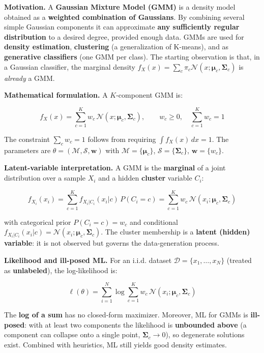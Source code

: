 \textbf{Motivation.} A \textbf{Gaussian Mixture Model (GMM)} is a density model obtained as a \textbf{weighted combination of Gaussians}. By combining several simple Gaussian components it can approximate \textbf{any sufficiently regular distribution} to a desired degree, provided enough data. GMMs are used for \textbf{density estimation}, \textbf{clustering} (a generalization of K-means), and as \textbf{generative classifiers} (one GMM per class). The starting observation is that, in a Gaussian classifier, the marginal density $f_X(x) = \sum_c \pi_c \mathcal{N}(x;\boldsymbol{\mu}_c,\boldsymbol{\Sigma}_c)$ is \textit{already} a GMM.

\textbf{Mathematical formulation.} A $K$-component GMM is:

$$f_X(x) = \sum_{c=1}^K w_c\,\mathcal{N}(x;\boldsymbol{\mu}_c,\boldsymbol{\Sigma}_c), \qquad w_c \ge 0,\quad \sum_{c=1}^K w_c = 1$$

The constraint $\sum_c w_c = 1$ follows from requiring $\int f_X(x)\,dx = 1$. The parameters are $\theta = (\mathcal{M},\mathcal{S},\mathbf{w})$ with $\mathcal{M}=\{\boldsymbol{\mu}_c\}$, $\mathcal{S}=\{\boldsymbol{\Sigma}_c\}$, $\mathbf{w}=\{w_c\}$.

\textbf{Latent-variable interpretation.} A GMM is the \textbf{marginal} of a joint distribution over a sample $X_i$ and a hidden \textbf{cluster} variable $C_i$:

$$f_{X_i}(x_i) = \sum_{c=1}^K f_{X_i|C_i}(x_i|c)\,P(C_i=c) = \sum_{c=1}^K w_c\,\mathcal{N}(x_i;\boldsymbol{\mu}_c,\boldsymbol{\Sigma}_c)$$

with categorical prior $P(C_i=c)=w_c$ and conditional $f_{X_i|C_i}(x_i|c)=\mathcal{N}(x_i;\boldsymbol{\mu}_c,\boldsymbol{\Sigma}_c)$. The cluster membership is a \textbf{latent (hidden) variable}: it is not observed but governs the data-generation process.

\textbf{Likelihood and ill-posed ML.} For an i.i.d. dataset $\mathcal{D}=\{x_1,\dots,x_N\}$ (treated as \textbf{unlabeled}), the log-likelihood is:

$$\ell(\theta) = \sum_{i=1}^N \log \sum_{c=1}^K w_c\,\mathcal{N}(x_i;\boldsymbol{\mu}_c,\boldsymbol{\Sigma}_c)$$

The \textbf{log of a sum} has no closed-form maximizer. Moreover, ML for GMMs is \textbf{ill-posed}: with at least two components the likelihood is \textbf{unbounded above} (a component can collapse onto a single point, $\boldsymbol{\Sigma}_c \to 0$), so degenerate solutions exist. Combined with heuristics, ML still yields good density estimates.

